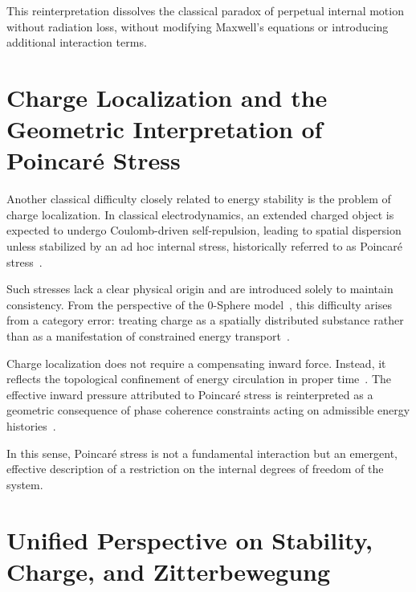 \documentclass[12pt,a4paper]{article}
\begin{document}
This reinterpretation dissolves the classical paradox of perpetual internal motion without radiation loss, without modifying Maxwell's equations or introducing additional interaction terms.

\section{Charge Localization and the Geometric Interpretation of Poincar\'e Stress}
\label{sec:poincare}

\justifying

Another classical difficulty closely related to energy stability is the problem of charge localization. In classical electrodynamics, an extended charged object is expected to undergo Coulomb-driven self-repulsion, leading to spatial dispersion unless stabilized by an ad hoc internal stress, historically referred to as Poincar\'e stress~\cite{poincare1906,lorentz1952,rohrlich2007}.

Such stresses lack a clear physical origin and are introduced solely to maintain consistency. From the perspective of the 0-Sphere model~\cite{hanamura16759284}, this difficulty arises from a category error: treating charge as a spatially distributed substance rather than as a manifestation of constrained energy transport~\cite{hanamura18203433}.

Charge localization does not require a compensating inward force. Instead, it reflects the topological confinement of energy circulation in proper time~\cite{hanamura18275142,hanamura18356895}. The effective inward pressure attributed to Poincar\'e stress is reinterpreted as a geometric consequence of phase coherence constraints acting on admissible energy histories~\cite{hanamura18511664,hanamura18437010}.

In this sense, Poincar\'e stress is not a fundamental interaction but an emergent, effective description of a restriction on the internal degrees of freedom of the system.

\section{Unified Perspective on Stability, Charge, and Zitterbewegung}
\label{sec:unified}
\end{document}
